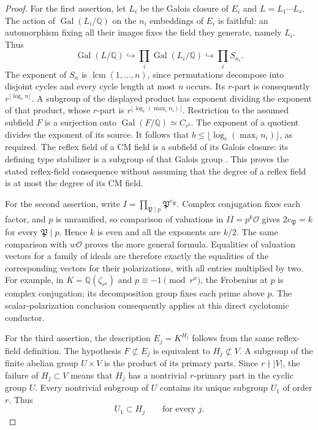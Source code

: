 \documentclass[11pt]{article}
\theoremstyle{definition}
\theoremstyle{remark}
\begin{document}
\begin{proof}
For the first assertion, let $L_i$ be the Galois closure of $E_i$
and $L=L_1\cdots L_s$.  The action of
$\operatorname{Gal}(L_i/\mathbb Q)$ on the $n_i$ embeddings of
$E_i$ is faithful: an automorphism fixing all their images fixes
the field they generate, namely $L_i$.  Thus
\[
 \operatorname{Gal}(L/\mathbb Q)
 \hookrightarrow\prod_i\operatorname{Gal}(L_i/\mathbb Q)
 \hookrightarrow\prod_i S_{n_i}.
\]
The exponent of $S_n$ is $\operatorname{lcm}(1,\ldots,n)$,
since permutations decompose into disjoint cycles and every cycle
length at most $n$ occurs.  Its $r$-part is consequently
$r^{\lfloor\log_r n\rfloor}$.  A subgroup of the displayed
product has exponent dividing the exponent of that product, whose
$r$-part is $r^{\lfloor\log_r(\max_i n_i)\rfloor}$.
Restriction to the assumed subfield $F$ is a surjection onto
$\operatorname{Gal}(F/\mathbb Q)\simeq C_{r^b}$.  The exponent
of a quotient divides the exponent of its source.  It follows that
$b\leq\lfloor\log_r(\max_i n_i)\rfloor$, as required.
The reflex field of a CM field is a subfield of its Galois closure:
its defining type stabilizer is a subgroup of that Galois group
\citep[Proposition~1.16 and Example~1.19, pp.~13--14]{MilneCM2020}.
This proves the stated reflex-field consequence without assuming
that the degree of a reflex field is at most the degree of its
CM field.

For the second assertion, write
$I=\prod_{\mathfrak P\mid p}\mathfrak P^{e_{\mathfrak P}}$.
Complex conjugation fixes each factor, and $p$ is unramified, so
comparison of valuations in $I\overline I=p^k\mathcal O$ gives
$2e_{\mathfrak P}=k$ for every $\mathfrak P\mid p$.
Hence $k$ is even and all the exponents are $k/2$.
The same comparison with $w\mathcal O$ proves the more general
formula.  Equalities of valuation vectors for a family of ideals
are therefore exactly the equalities of the corresponding vectors
for their polarizations, with all entries multiplied by two.
For example, in $K=\mathbb Q(\zeta_{r^a})$ and
$p\equiv-1\pmod{r^a}$, the Frobenius at $p$ is complex
conjugation; its decomposition group fixes each prime above $p$.
The scalar-polarization conclusion consequently applies at this
direct cyclotomic conductor.

For the third assertion, the description $E_j=K^{H_j}$ follows
from the same reflex-field definition.  The hypothesis
$F\not\subset E_j$ is equivalent to $H_j\not\subset V$.
A subgroup of the finite abelian group $U\times V$ is the product
of its primary parts.  Since $r\nmid |V|$, the failure of
$H_j\subset V$ means that $H_j$ has a nontrivial $r$-primary
part in the cyclic group $U$.  Every nontrivial subgroup of $U$
contains its unique subgroup $U_1$ of order $r$.  Thus
\[
 U_1\subset H_j\qquad\text{for every }j.
\]


\end{proof}
\end{document}
